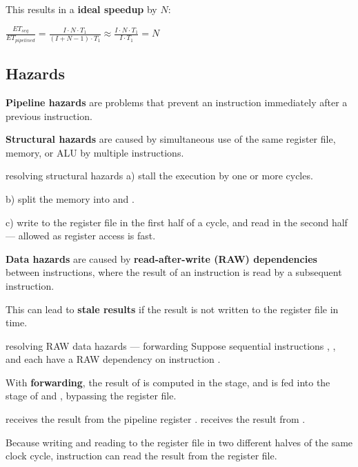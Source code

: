 This results in a \textbf{ideal speedup} by $N$:

\( \frac{ET_{seq}}{ET_{pipelined}} = \frac{I \cdot N \cdot T_1}{(I + N - 1) \cdot T_1} \approx \frac{I \cdot N \cdot T_1}{I \cdot T_1} = N \)


\subsection{Hazards}

\textbf{Pipeline hazards} are problems that prevent an instruction immediately
after a previous instruction.

\textbf{Structural hazards} are caused by simultaneous use of the same register file,
memory, or ALU by multiple instructions.

\begin{defn}{resolving structural hazards}
    a) stall the execution by one or more cycles.

    b) split the memory into  and .

    c) write to the register file in the first half of a cycle,
    and read in the second half --- allowed as register access is fast.
\end{defn}

\textbf{Data hazards} are caused by \textbf{read-after-write (RAW) dependencies} between instructions,
where the result of an instruction is read by a subsequent instruction.

This can lead to \textbf{stale results} if the result is not written to the register file in time.

\begin{defn}{resolving RAW data hazards --- forwarding}
    Suppose sequential instructions , , and  each have a RAW dependency on
    instruction .

    With \textbf{forwarding}, the result of  is computed in the  stage, and
    is fed into the  stage of  and , bypassing the register file.

     receives the result from the pipeline register .
     receives the result from .

    Because writing and reading to the register file in two different halves of the same clock cycle,
    instruction  can read the result from the register file.
\end{defn}

